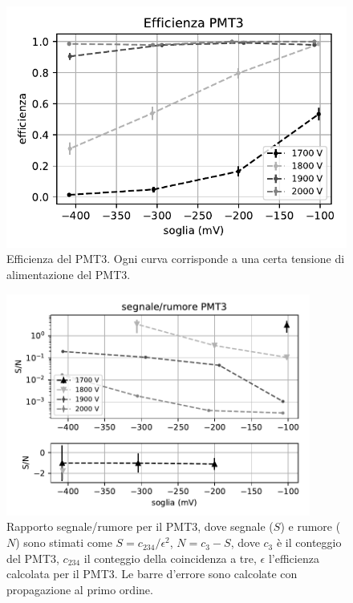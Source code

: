\documentclass[a4paper]{article}
\begin{document}
\begin{figure}
	\centering
	\includegraphics[width=8 cm]{efficienza}
	\caption{\label{eff}%
	Efficienza del PMT3.
	Ogni curva corrisponde a una certa tensione di alimentazione del PMT3.}
\end{figure}

\begin{figure}
	\centering
	\includegraphics[width=10cm]{SN3}
	\caption{%
	\label{fig:sn3}%
	Rapporto segnale/rumore per il PMT3,
	dove segnale ($S$) e rumore ($N$) sono stimati come
	$S=c_{234}/\epsilon^2$,
	$N=c_3 - S$,
	dove $c_3$ è il conteggio del PMT3,
	$c_{234}$ il conteggio della coincidenza a tre,
	$\epsilon$ l'efficienza calcolata per il PMT3.
	Le barre d'errore sono calcolate con propagazione al primo ordine.}
\end{figure}
\end{document}
